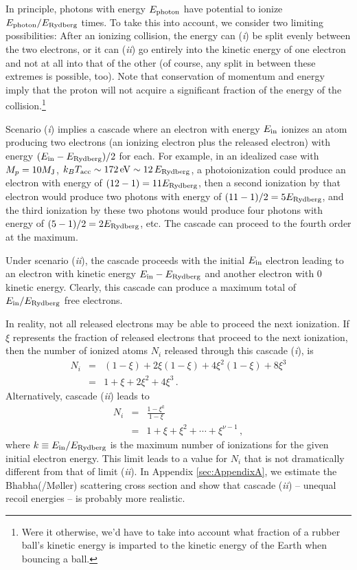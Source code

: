\documentclass[iop,numberedappendix,apj]{emulateapj}
\begin{document}
In principle, photons with energy $E_{\rm photon}$ have potential to ionize $E_{\rm photon}/E_{\rm Rydberg}$ times.
To take this into account, we consider two limiting possibilities:
After an ionizing collision, the energy can (\emph{i}) be split evenly between the two electrons, or it can (\emph{ii}) go entirely into the kinetic energy of one electron and not at all into that of the other (of course, any split in between these extremes is possible, too).
Note that conservation of momentum and energy imply that the proton will not acquire a significant fraction of the energy of the collision.\footnote{Were it otherwise, we'd have to take into account what fraction of a rubber ball's kinetic energy is imparted to the kinetic energy of the Earth when bouncing a ball.}  

Scenario (\emph{i}) implies a cascade where an electron with energy $E_{\rm in}$ ionizes an atom producing two electrons (an ionizing electron plus the released electron) with energy $ ( E_{\rm in} - E_{\rm Rydberg} ) /2 $ for each.
For example, in an idealized case with $M_p = 10 M_{\rm J}$, $k_B T_{\rm acc} \sim 172\,{\rm eV} \sim 12 \, E_{\rm Rydberg}$, a photoionization could produce an electron with energy of $(12-1) = 11 E_{\rm Rydberg} $, then a second ionization by that electron would produce two photons with energy of $(11-1)/2 = 5 E_{\rm Rydberg}$, and the third ionization by these two photons would produce four photons with energy of $(5-1)/2 = 2 E_{\rm Rydberg}$, etc.
The cascade can proceed to the fourth order at the maximum.

Under scenario (\emph{ii}), the cascade proceeds with the initial $E_{\rm in}$ electron leading to an electron with kinetic energy $E_{\rm in} - E_{\rm Rydberg}$ and another electron with 0 kinetic energy.
Clearly, this cascade can produce a maximum total of $E_{\rm in} / E_{\rm Rydberg}$ free electrons.

In reality, not all released electrons may be able to proceed the next ionization.
If $\xi$ represents the fraction of released electrons that proceed to the next ionization, then the number of ionized atoms $N_i$ released through this cascade (\emph{i}), is
\begin{eqnarray}
  \nonumber N_i & = & (1-\xi) + 2\xi (1-\xi) + 4 \xi^2 (1-\xi) + 8 \xi^3 \\
  \label{eq:N_i1} & = & 1 + \xi + 2 \xi^2 + 4 \xi ^3 \, .
\end{eqnarray}
Alternatively, cascade (\emph{ii}) leads to
\begin{eqnarray}
  \nonumber N_i & = & \frac{1 - \xi^k}{1 - \xi} \\
  \label{eq:N_i2}  & = & 1 + \xi + \xi^2 + \cdots + \xi^{\nu - 1} \, ,
\end{eqnarray}
where $k \equiv E_{\rm in} / E_{\rm Rydberg}$ is the maximum number of ionizations for the given initial electron energy.
This limit leads to a value for $N_i$ that is not dramatically different from that of limit (\emph{ii}).
In Appendix \ref{sec:AppendixA}, we estimate the Bhabha(/M{\o}ller) scattering cross section and show that cascade (\emph{ii}) -- unequal recoil energies -- is probably more realistic.
\end{document}
